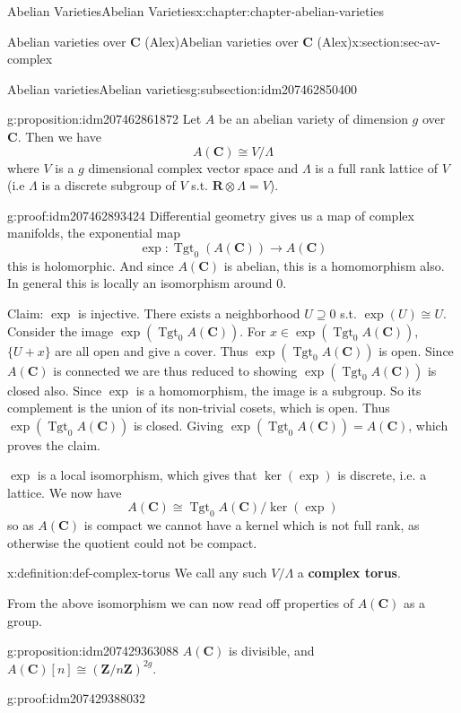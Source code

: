 \documentclass[oneside,10pt,]{book}
\newcommand{\terminology}[1]{\textbf{#1}}
\numberwithin{equation}{section}
\newcommand{\lb}{[}
\newcommand{\rb}{]}
\newcommand{\ZZ}{\mathbf{Z}}
\newcommand{\RR}{\mathbf{R}}
\newcommand{\CC}{\mathbf{C}}
\DeclareMathOperator{\Tgt}{Tgt}
\begin{document}
\begin{chapterptx}{Abelian Varieties}{}{Abelian Varieties}{}{}{x:chapter:chapter-abelian-varieties}
\begin{sectionptx}{Abelian varieties over \(\CC\) (Alex)}{}{Abelian varieties over \(\CC\) (Alex)}{}{}{x:section:sec-av-complex}
\begin{subsectionptx}{Abelian varieties}{}{Abelian varieties}{}{}{g:subsection:idm207462850400}
\begin{proposition}{}{}{g:proposition:idm207462861872}
Let \(A\) be an abelian variety of dimension \(g\) over \(\CC\). Then we have%
\begin{equation*}
A(\CC) \cong V/\Lambda
\end{equation*}
where \(V\) is a \(g\) dimensional complex vector space and \(\Lambda\) is a full rank lattice of \(V\) (i.e \(\Lambda\) is a discrete subgroup of \(V\) s.t. \(\RR\otimes \Lambda  = V\)).%
\end{proposition}
\begin{proofptx}{}{g:proof:idm207462893424}
Differential geometry gives us a map of complex manifolds, the exponential map%
\begin{equation*}
\exp\colon\Tgt_0(A(\CC)) \to A(\CC)
\end{equation*}
this is holomorphic. And since \(A(\CC)\) is abelian, this is a homomorphism also. In general this is locally an isomorphism around 0.%
\par
Claim: \(\exp\) is injective. There exists a neighborhood \(U\supseteq 0\) s.t. \(\exp(U) \cong U\). Consider the image \(\exp(\Tgt_0 A(\CC))\). For \(x\in \exp(\Tgt_0 A(\CC))\), \(\{U+x\}\) are all open and give a cover. Thus \(\exp(\Tgt_0A(\CC))\) is open. Since \(A(\CC)\) is connected we are thus reduced to showing \(\exp(\Tgt_0 A(\CC))\) is closed also. Since \(\exp\) is a homomorphism, the image is a subgroup. So its complement is the union of its non-trivial cosets, which is open. Thus \(\exp(\Tgt_0A(\CC))\) is closed. Giving \(\exp(\Tgt_0A(\CC)) = A(\CC)\), which proves the claim.%
\par
\(\exp\) is a local isomorphism, which gives that \(\ker(\exp)\) is discrete, i.e. a lattice. We now have%
\begin{equation*}
A(\CC) \cong \Tgt_0A(\CC)/ \ker(\exp)
\end{equation*}
so as \(A(\CC)\) is compact we cannot have a kernel which is not full rank, as otherwise the quotient could not be compact.%
\end{proofptx}
\begin{definition}{}{x:definition:def-complex-torus}%
We call any such \(V/\Lambda\) a \terminology{complex torus}.%
\end{definition}
From the above isomorphism we can now read off properties of \(A(\CC)\) as a group.%
\begin{proposition}{}{}{g:proposition:idm207429363088}%
\(A(\CC)\) is divisible, and \(A(\CC)\lb n\rb \cong (\ZZ/n\ZZ)^{2g}\).%
\end{proposition}
\begin{proofptx}{}{g:proof:idm207429388032}

\end{proofptx}
\end{subsectionptx}
\end{sectionptx}
\end{chapterptx}
\end{document}
